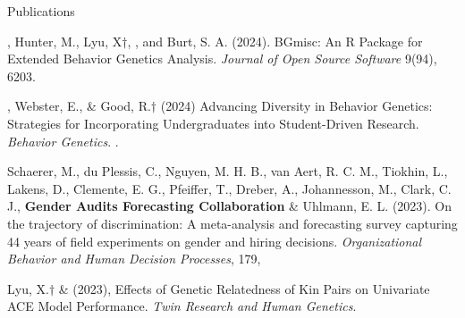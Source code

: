 \begin{rSection}{\textrm{Publications}}
\begin{etaremune}
\item \meb, Hunter, M., Lyu, X$\dagger$, \jdt, and Burt, S. A. (2024). BGmisc: An R Package for Extended Behavior Genetics Analysis. \textit{Journal of Open Source Software} 9(94), 6203. 
\item \meb, Webster, E.\noteA, \& Good, R.\noteA$\dagger$ (2024) Advancing Diversity in Behavior Genetics: Strategies for Incorporating Undergraduates into Student-Driven Research. \textit{Behavior Genetics}. . 
\item Schaerer, M., du Plessis, C., Nguyen, M. H. B., van Aert, R. C. M., Tiokhin, L., Lakens, D., Clemente, E. G., Pfeiffer, T., Dreber, A., Johannesson, M., Clark, C. J., \textbf{Gender Audits Forecasting Collaboration} \& Uhlmann, E. L. (2023). On the trajectory of discrimination: A meta-analysis and forecasting survey capturing 44 years of field experiments on gender and hiring decisions. \textit{Organizational Behavior and Human Decision Processes}, 179, 

\item Lyu, X.$\dagger$ \& \meb (2023), Effects of Genetic Relatedness of Kin Pairs on Univariate ACE Model Performance. \textit{Twin Research and Human Genetics}. 


\end{etaremune}
\end{rSection}

